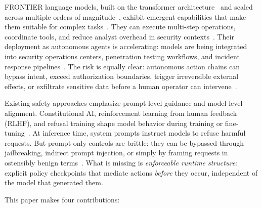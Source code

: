 \documentclass[journal]{IEEEtran}
\begin{document}
FRONTIER language models, built on the transformer architecture~\cite{vaswani2017attention} and scaled across multiple orders of magnitude~\cite{brown2020language,kaplan2020scaling,hoffmann2022training}, exhibit emergent capabilities that make them suitable for complex tasks~\cite{wei2022emergent}. They can execute multi-step operations, coordinate tools, and reduce analyst overhead in security contexts~\cite{openai2023gpt4,deepseek2024,geminiteam2023}. Their deployment as autonomous agents is accelerating: models are being integrated into security operations centers, penetration testing workflows, and incident response pipelines~\cite{deng2023pentestgpt,fang2024llmagent,bommasani2021opportunities}. The risk is equally clear: autonomous action chains can bypass intent, exceed authorization boundaries, trigger irreversible external effects, or exfiltrate sensitive data before a human operator can intervene~\cite{weidinger2022taxonomy,ganguli2022red,amodei2016concrete}.

Existing safety approaches emphasize prompt-level guidance and model-level alignment. Constitutional AI, reinforcement learning from human feedback (RLHF), and refusal training shape model behavior during training or fine-tuning~\cite{bai2022constitutional}. At inference time, system prompts instruct models to refuse harmful requests. But prompt-only controls are brittle: they can be bypassed through jailbreaking, indirect prompt injection, or simply by framing requests in ostensibly benign terms~\cite{jiang2024wildteaming,han2024asb}. What is missing is \emph{enforceable runtime structure}: explicit policy checkpoints that mediate actions \emph{before} they occur, independent of the model that generated them.

This paper makes four contributions:
\end{document}

